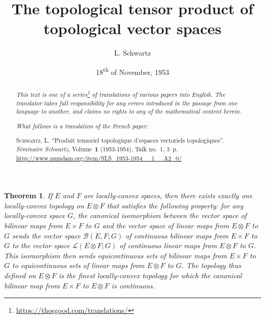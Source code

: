 \documentclass{article}
\title{The topological tensor product of topological vector spaces}
\author{L. Schwartz}
\date{18\textsuperscript{th} of November, 1953}
\theoremstyle{plain}
\newtheorem*{theorem}{Theorem}
\theoremstyle{definition}
\newcommand{\BB}{\mathcal{B}}
\newcommand{\LL}{\mathcal{L}}
\newcommand{\oldpage}[1]{\marginpar{\footnotesize$\Big\vert$ \textit{p.~#1}}}
\begin{document}
\maketitle
\thispagestyle{fancy}

\renewcommand{\abstractname}{Translator's note.}

\begin{abstract}
  \renewcommand*{\thefootnote}{\fnsymbol{footnote}}
  \emph{This text is one of a series\footnote{\url{https://thosgood.com/translations/}} of translations of various papers into English.}
  \emph{The translator takes full responsibility for any errors introduced in the passage from one language to another, and claims no rights to any of the mathematical content herein.}
  
  \emph{What follows is a translation of the French paper:}

  \medskip\noindent
  \textsc{Schwartz, L.}
  ``Produit tensoriel topologique d'espaces vectoriels topologiques''.
  \emph{S\'{e}minaire Schwartz}, Volume~\textbf{1} (1953-1954), Talk no.~1, 3~p.
  {\footnotesize\url{http://www.numdam.org/item/SLS_1953-1954__1__A2_0/}}
\end{abstract}

\setcounter{footnote}{0}



\oldpage{1}
\begin{theorem}
  If $E$ and $F$ are locally-convex spaces, then there exists exactly one locally-convex topology on $E\otimes F$ that satisfies the following property:
  for any locally-convex space $G$, the canonical isomorphism between the vector space of bilinear maps from $E\times F$ to $G$ and the vector space of linear maps from $E\otimes F$ to $G$ sends the vector space $\BB(E,F;G)$ of continuous bilinear maps from $E\times F$ to $G$ to the vector space $\LL(E\otimes F;G)$ of continuous linear maps from $E\otimes F$ to $G$.
  This isomorphism then sends equicontinuous sets of bilinear maps from $E\times F$ to $G$ to equicontinuous sets of linear maps from $E\otimes F$ to $G$.
  The topology thus defined on $E\otimes F$ is the finest locally-convex topology for which the canonical bilinear map from $E\times F$ to $E\otimes F$ is continuous.
\end{theorem}
\end{document}
